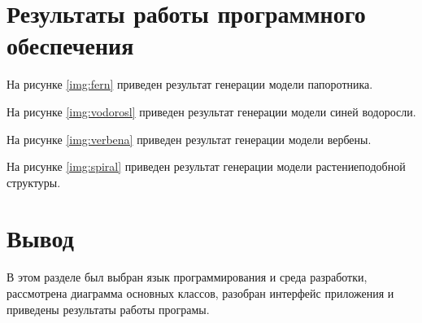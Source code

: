 
\section{Результаты работы программного обеспечения}

На рисунке \ref{img:fern} приведен результат генерации модели папоротника.


На рисунке \ref{img:vodorosl} приведен результат генерации модели синей водоросли.


На рисунке \ref{img:verbena} приведен результат генерации модели вербены.



На рисунке \ref{img:spiral} приведен результат генерации модели растениеподобной структуры.


\newpage

\section*{Вывод}
В этом разделе был выбран язык программирования и среда разработки, рассмотрена диаграмма основных классов, разобран интерфейс приложения и приведены результаты работы програмы.